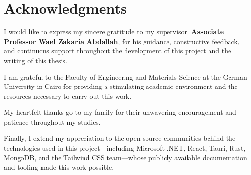\chapter*{Acknowledgments}
\label{chap:ack}
\pagestyle{plain}

I would like to express my sincere gratitude to my supervisor, \textbf{Associate Professor Wael Zakaria Abdallah}, for his guidance, constructive feedback, and continuous support throughout the development of this project and the writing of this thesis.

I am grateful to the Faculty of Engineering and Materials Science at the German University in Cairo for providing a stimulating academic environment and the resources necessary to carry out this work.

My heartfelt thanks go to my family for their unwavering encouragement and patience throughout my studies.

Finally, I extend my appreciation to the open-source communities behind the technologies used in this project---including Microsoft .NET, React, Tauri, Rust, MongoDB, and the Tailwind CSS team---whose publicly available documentation and tooling made this work possible.

